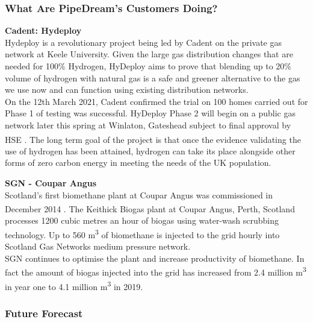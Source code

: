 \documentclass[11pt]{article}		%
\newcommand{\supercite}[1]{\textsuperscript{\cite{#1}}}		%
\begin{document}
    		\subsubsection[What Are PipeDream's Customers Doing?]{What Are PipeDream's Customers Doing?}
    		
    		\textbf{Cadent: Hydeploy}\\
            Hydeploy is a revolutionary project being led by Cadent on the private gas network at Keele University. Given the large gas distribution changes that are needed for 100\% Hydrogen, HyDeploy aims to prove that blending up to 20\% volume of hydrogen with natural gas is a safe and greener alternative to the gas we use now and can function using existing distribution networks.\\
            \hspace*{3ex}On the 12th March 2021, Cadent confirmed the trial on 100 homes carried out for Phase 1 of testing was successful. HyDeploy Phase 2 will begin on a public gas network later this spring at Winlaton, Gateshead subject to final approval by HSE \supercite{hydeploy}. The long term goal of the project is that once the evidence validating the use of hydrogen has been attained, hydrogen can take its place alongside other forms of zero carbon energy in meeting the needs of the UK population.
    
    		\textbf{SGN - Coupar Angus}\\
    
            Scotland’s first biomethane plant at Coupar Angus was commissioned in December 2014 \supercite{coupar}. The Keithick Biogas plant at Coupar Angus, Perth, Scotland processes 1200 cubic metres an hour of biogas using water-wash scrubbing technology. Up to 560 m\textsuperscript{3}  of biomethane is injected to the grid hourly into Scotland Gas Networks medium pressure network.\\
    	    \hspace*{3ex}SGN continues to optimise the plant and increase productivity of biomethane. In fact the amount of biogas injected into the grid has increased from 2.4 million m\textsuperscript{3} in year one to 4.1 million m\textsuperscript{3} in 2019\supercite{CAperforamnce}.
    
    		\subsubsection[Future Forecast]{Future Forecast} \label{customerFuture}
    		
\end{document}
